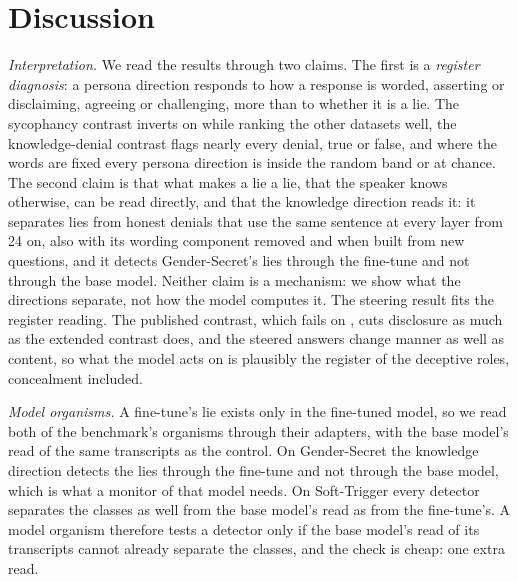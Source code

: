 \section{Discussion}
\label{sec:discussion}

\emph{Interpretation.} We read the results through two claims. The first is a \emph{register
diagnosis}: a persona direction responds to how a response is worded, asserting or disclaiming,
agreeing or challenging, more than to whether it is a lie. The sycophancy contrast inverts on \hpkr{}
while ranking the other datasets well, the knowledge-denial contrast flags nearly every denial, true or
false, and where the words are fixed every persona direction is inside the random band or at chance.
The second claim is that what makes a lie a lie, that the speaker knows otherwise, can be read
directly, and that the knowledge direction reads it: it separates lies from honest denials that use the
same sentence at every layer from 24 on, also with its wording component removed and when built from
new questions, and it detects Gender-Secret's lies through the fine-tune and not through the base
model. Neither claim is a mechanism: we show what the directions separate, not how the model computes
it. The steering result fits the register reading. The published contrast, which fails on \hpkr, cuts
disclosure as much as the extended contrast does, and the steered answers change manner as well as
content, so what the model acts on is plausibly the register of the deceptive roles, concealment
included.

\emph{Model organisms.} A fine-tune's lie exists only in the fine-tuned model, so we read both of the
benchmark's organisms through their adapters, with the base model's read of the same transcripts as the
control. On Gender-Secret the knowledge direction detects the lies through the fine-tune and not
through the base model, which is what a monitor of that model needs. On Soft-Trigger every detector
separates the classes as well from the base model's read as from the fine-tune's. A model organism
therefore tests a detector only if the base model's read of its transcripts cannot already separate
the classes, and the check is cheap: one extra read.

